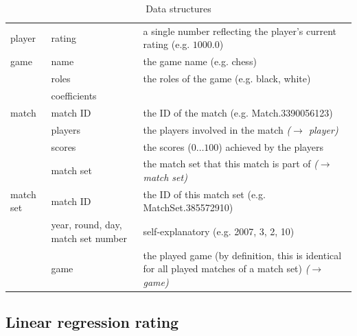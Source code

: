 \documentclass[a4paper,10pt]{article}
\begin{document}
\begin{table}
\begin{center}
\begin{longtable}{l p{2.8cm} p{6cm}}
player & rating & a single number reflecting the player's current rating (e.g. $1000.0$) \\ 
game & name & the game name (e.g. chess) \\ 
 & roles & the roles of the game (e.g. black, white) \\ 
 & coefficients &  \\ %
match & match ID & the ID of the match (e.g. Match.3390056123) \\ 
 & players & the players involved in the match \textit{($\rightarrow$ player)} \\ 
 & scores & the scores ($0 \dotsc 100$) achieved by the players\\ 
 & match set & the match set that this match is part of \textit{($\rightarrow$ match set)} \\ 
match set & match ID & the ID of this match set (e.g. MatchSet.385572910) \\ 
 & year, round, day, match set number & self-explanatory (e.g. 2007, 3, 2, 10) \\ 
 & game & the played game (by definition, this is identical for all played matches of a match set) \textit{($\rightarrow$ game)}
\end{longtable}
\end{center}
\caption{Data structures}
\label{tab:data_structures}
\end{table} 

\subsection{Linear regression rating}
\end{document}

